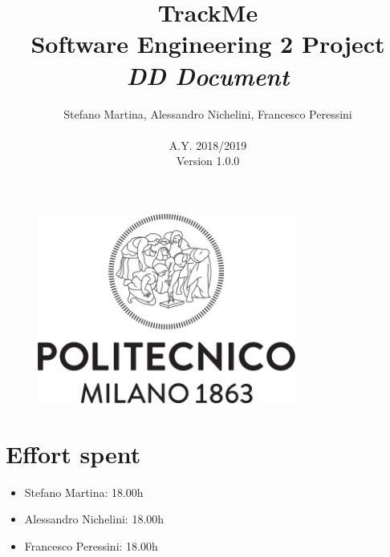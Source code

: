 \documentclass{article}
\begin{document}
	\begin{figure}[t]
	\centering
	\includegraphics[height=6.25cm,keepaspectratio]{Figures/logo}
	\end{figure}
	
	\title{TrackMe \\ Software Engineering 2 Project \\ 
			\textit{DD Document}}
	\author{Stefano Martina, Alessandro Nichelini, Francesco Peressini
		\\ \\ A.Y. 2018/2019 \\ Version 1.0.0}
		
\maketitle
\newpage

\tableofcontents
\newpage







\section{Effort spent}
\begin{itemize}
	\item Stefano Martina: 18.00h
	\item Alessandro Nichelini: 18.00h
	\item Francesco Peressini: 18.00h
\end{itemize}
\end{document}
